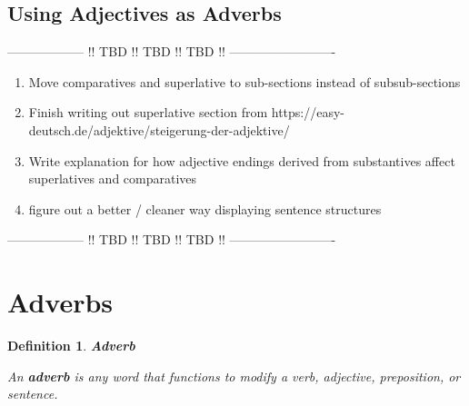 \documentclass[a4paper,12pt]{article}
\newtheorem{mydef}{Definition}
\begin{document}
\subsection{\bf{Using Adjectives as Adverbs}}
\begin{adjustwidth}{2em}{0pt}
\label{sec:using_adjectives_as_adverbs}



\end{adjustwidth}


\begin{center}
\color{red}
------------------ !! TBD !! TBD !! TBD !! -------------------------

\begin{enumerate}[noitemsep]

	\item Move comparatives and superlative to sub-sections instead of
		subsub-sections 
	\item Finish writing out superlative section from
		https://easy-deutsch.de/adjektive/steigerung-der-adjektive/
	\item Write explanation for how adjective endings derived from substantives
		affect superlatives and comparatives
	\item figure out a better / cleaner way displaying sentence structures
 
\end{enumerate}

------------------ !! TBD !! TBD !! TBD !! -------------------------
\color{black}
\end{center}




\pagebreak

\section{{Adverbs}}
\label{sec:adverbs}

\begin{mydef}{\bf{Adverb}}
\begin{defn-background}

An \textbf{adverb }is any word that functions to modify a verb, adjective,
preposition, or sentence.


\end{defn-background}
\end{mydef}
\vspace{0.25cm}
\end{document}
